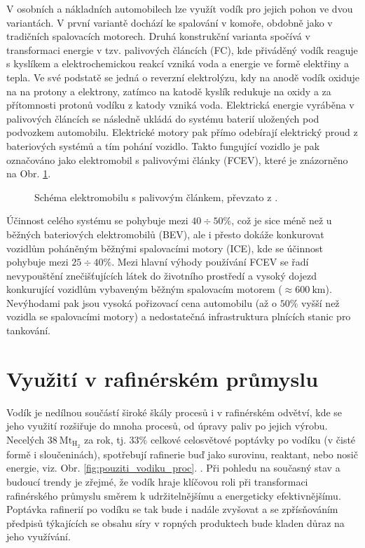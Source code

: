V osobních a nákladních automobilech lze využít vodík pro jejich pohon ve dvou variantách. V první variantě dochází ke spalování v komoře, obdobně jako v tradičních spalovacích motorech. Druhá konstrukční varianta spočívá v transformaci energie v tzv. palivových článcích (\acs{FC}), kde přiváděný vodík reaguje s kyslíkem a elektrochemickou reakcí vzniká voda a energie ve formě elektřiny a tepla. \cite{Hytep,Mekhilef2012,Turon2020}
Ve své podstatě se jedná o reverzní elektrolýzu, kdy na anodě vodík oxiduje na
na protony a elektrony, zatímco na katodě kyslík redukuje na oxidy a za přítomnosti protonů vodíku z katody vzniká voda. Elektrická energie vyráběna v palivových článcích se následně ukládá do systému baterií uložených pod podvozkem automobilu. Elektrické motory pak přímo odebírají elektrický proud z bateriových systémů a tím pohání vozidlo. Takto fungující vozidlo je pak označováno jako elektromobil s palivovými články (\acs{FCEV}), které je znázorněno na Obr. \ref{fig:fcev}. \cite{Mekhilef2012}
\begin{figure}[h]
    \centering
    
    \caption[Schéma elektromobilu s palivovým článkem]{Schéma elektromobilu s palivovým článkem, převzato z \cite{Arif2023}.} \label{fig:fcev}
\end{figure}

Účinnost celého systému se pohybuje mezi $40\div50\%$, což je sice méně než u běžných bateriových elektromobilů (BEV), ale i přesto dokáže konkurovat vozidlům poháněným běžnými spalovacími motory (ICE), kde se účinnost pohybuje mezi $25\div40\%$. \cite{Hytep,Mekhilef2012,Turon2020} Mezi hlavní výhody používání FCEV se řadí nevypouštění znečišťujících látek do životního prostředí a vysoký dojezd konkurující vozidlům vybaveným běžným spalovacím motorem ($\approx 600\ \mathrm{km}$). Nevýhodami pak jsou vysoká pořizovací cena automobilu (až o $50\%$ vyšší než vozidla se spalovacími motory) a nedostatečná infrastruktura plnících stanic pro tankování. \cite{Hytep,Turon2020}

\section{Využití v rafinérském průmyslu}
\label{sec:vyuziti_raf}

Vodík je nedílnou součástí široké škály procesů i v rafinérském odvětví, kde se jeho využití rozšiřuje do mnoha procesů, od úpravy paliv po jejich výrobu. Necelých $38\ \mathrm{Mt_{H_2}}$ za rok, tj. $33\%$ celkové celosvětové poptávky po vodíku (v čisté formě i sloučeninách), spotřebují rafinerie buď jako surovinu, reaktant, nebo nosič energie, viz. Obr. \ref{fig:pouziti_vodiku_proc}. \cite{IEAfuture}. Při pohledu na současný stav a budoucí trendy je zřejmé, že vodík hraje klíčovou roli při transformaci rafinérského průmyslu směrem k udržitelnějšímu a energeticky efektivnějšímu. Poptávka rafinerií po vodíku se tak bude i nadále zvyšovat a se zpřísňováním předpisů týkajících se obsahu síry v ropných produktech bude kladen důraz na jeho využívání. \cite{Blazek2006} 

